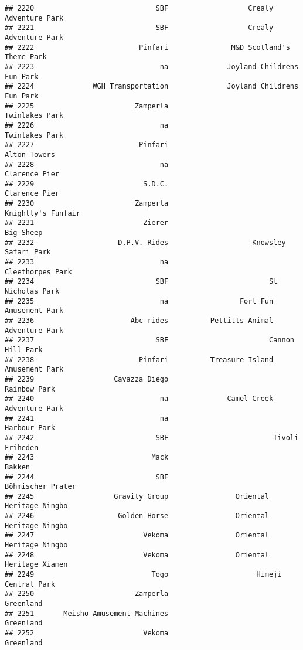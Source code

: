 \documentclass[
]{article}
\begin{document}
\begin{verbatim}
## 2220                             SBF                   Crealy Adventure Park
## 2221                             SBF                   Crealy Adventure Park
## 2222                         Pinfari               M&D Scotland's Theme Park
## 2223                              na              Joyland Childrens Fun Park
## 2224              WGH Transportation              Joyland Childrens Fun Park
## 2225                        Zamperla                          Twinlakes Park
## 2226                              na                          Twinlakes Park
## 2227                         Pinfari                            Alton Towers
## 2228                              na                           Clarence Pier
## 2229                          S.D.C.                           Clarence Pier
## 2230                        Zamperla                      Knightly's Funfair
## 2231                          Zierer                               Big Sheep
## 2232                    D.P.V. Rides                    Knowsley Safari Park
## 2233                              na                        Cleethorpes Park
## 2234                             SBF                        St Nicholas Park
## 2235                              na                 Fort Fun Amusement Park
## 2236                       Abc rides          Pettitts Animal Adventure Park
## 2237                             SBF                        Cannon Hill Park
## 2238                         Pinfari          Treasure Island Amusement Park
## 2239                   Cavazza Diego                            Rainbow Park
## 2240                              na              Camel Creek Adventure Park
## 2241                              na                            Harbour Park
## 2242                             SBF                         Tivoli Friheden
## 2243                            Mack                                  Bakken
## 2244                             SBF                       Böhmischer Prater
## 2245                   Gravity Group                Oriental Heritage Ningbo
## 2246                    Golden Horse                Oriental Heritage Ningbo
## 2247                          Vekoma                Oriental Heritage Ningbo
## 2248                          Vekoma                Oriental Heritage Xiamen
## 2249                            Togo                     Himeji Central Park
## 2250                        Zamperla                               Greenland
## 2251       Meisho Amusement Machines                               Greenland
## 2252                          Vekoma                               Greenland

\end{verbatim}
\end{document}
